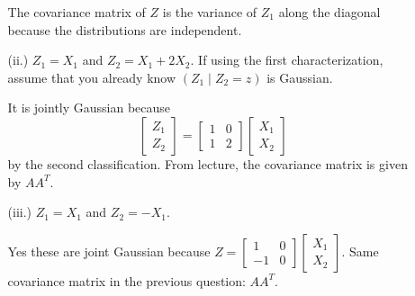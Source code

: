 \documentclass{article}
\begin{document}
\begin{itemize}
\begin{itemize}
\begin{answer}
                        The covariance matrix of $Z$ is the variance of $Z_{1}$ along the diagonal because the distributions are independent.
                    \end{answer}

                \item [(ii.)] $Z_{1} = X_{1}$ and $Z_{2} = X_{1} + 2X_{2}$. If using the first characterization, assume that you already know $(Z_{1} \mid Z_{2} = z)$ is Gaussian.
                    \begin{answer}
                        It is jointly Gaussian because 
                            \begin{equation*}
                                \begin{bmatrix}
                                    Z_{1} \\
                                    Z_{2}   
                                \end{bmatrix} = \begin{bmatrix}
                                    1 & 0 \\
                                    1 & 2   
                                \end{bmatrix} \begin{bmatrix}
                                    X_{1} \\
                                    X_{2}   
                                \end{bmatrix}
                            \end{equation*}
                        by the second classification. From lecture, the covariance matrix is given by $AA^{T}$.
                    \end{answer}

                \item [(iii.)] $Z_{1} = X_{1}$ and $Z_{2} = -X_{1}$.
                    \begin{answer}
                        Yes these are joint Gaussian because $Z = \begin{bmatrix}
                            1  & 0 \\
                            -1 & 0   
                        \end{bmatrix} \begin{bmatrix}
                            X_{1} \\
                            X_{2}   
                        \end{bmatrix}$. Same covariance matrix in the previous question: $AA^{T}$.
                    \end{answer}


\end{itemize}
\end{itemize}
\end{document}
